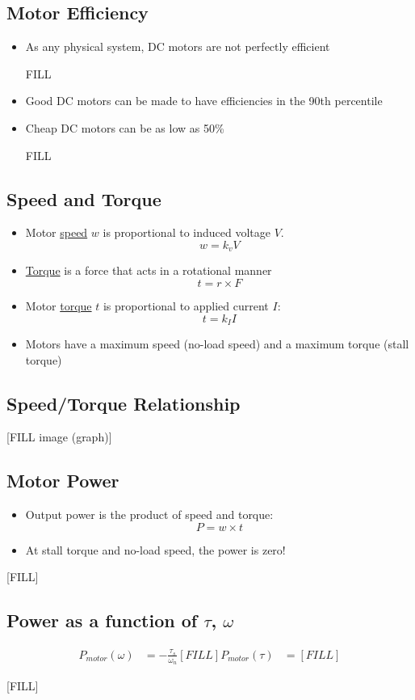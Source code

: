 \documentclass[10pt]{article}
\begin{document}
\subsection*{Motor Efficiency}
\begin{itemize}
	\item As any physical system, DC motors are not perfectly efficient
	\item [FILL]
	\item Good DC motors can be made to have efficiencies in the 90th percentile
	\item Cheap DC motors can be as low as 50\%
	\item [FILL]
\end{itemize}

\subsection*{Speed and Torque}
\begin{itemize}
	\item Motor \underline{speed} $w$ is proportional to induced voltage $V$.
	\[w = k_v V\]
    \item \underline{Torque} is a force that acts in a rotational manner
    \[t = r \times F\]
    \item Motor \underline{torque} $t$ is proportional to applied current $I$:
    \[t = k_I I\]
    \item Motors have a maximum speed (no-load speed) and a maximum torque (stall torque)
\end{itemize}

\subsection*{Speed/Torque Relationship}
[FILL image (graph)]

\subsection*{Motor Power}
\begin{itemize}
	\item Output power is the product of speed and torque:
	\[P = w \times t\]
    \item At stall torque and no-load speed, the power is zero!
\end{itemize}
\begin{center} 
	[FILL]
\end{center}

\subsection*{Power as a function of $\tau$, $\omega$}
\begin{align*}
    P_{motor}(\omega) &= -\frac{\tau_s}{\omega_n} [FILL]
    P_{motor}(\tau) &= [FILL]
\end{align*}
\begin{center} 
	[FILL]
\end{center}
\end{document}
